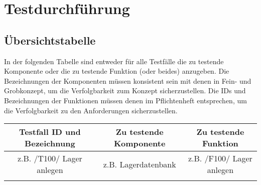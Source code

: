 
\chapter{Testdurchf\"uhrung}


\section{\"Ubersichtstabelle}
  In der folgenden Tabelle sind entweder f\"ur alle Testf\"alle die zu testende
  Komponente oder die zu testende Funktion (oder beides) anzugeben. Die
  Bezeichnungen der Komponenten m\"ussen konsistent sein mit denen in Fein- und
  Grobkonzept, um die Verfolgbarkeit zum Konzept sicherzustellen. Die IDs und
  Bezeichnungen der Funktionen m\"ussen denen im Pflichtenheft entsprechen, um
  die Verfolgbarkeit zu den Anforderungen sicherzustellen. \\
\begin{tabular}{|c|c|c|}
\hline
\textbf{Testfall ID und Bezeichnung} &  \textbf {Zu testende Komponente} &
\textbf {Zu testende Funktion}\\
\hline
z.B. /T100/ Lager anlegen &  z.B. Lagerdatenbank  & z.B. /F100/ Lager anlegen \\
\hline
&&
\end{tabular}

